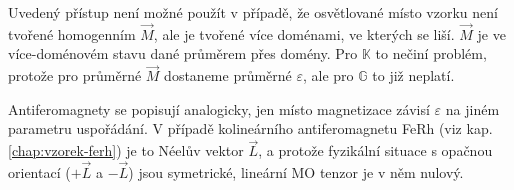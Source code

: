 Uvedený přístup není možné použít v případě, že osvětlované místo vzorku není tvořené homogenním $\vec{M}$, ale je tvořené více doménami, ve kterých se liší.
$\vec{M}$ je ve více-doménovém stavu dané průměrem přes domény.
Pro $\mathbb{K}$ to nečiní problém, protože pro průměrné $\vec{M}$ dostaneme průměrné $\varepsilon$, ale pro $\mathbb{G}$ to již neplatí.

Antiferomagnety se popisují analogicky, jen místo magnetizace závisí $\varepsilon$ na jiném parametru uspořádání.
V případě kolineárního antiferomagnetu FeRh (viz kap. \ref{chap:vzorek-ferh}) je to Néelův vektor $\vec{L}$,
a protože fyzikální situace s opačnou orientací ($+\vec{L}$ a $-\vec{L}$) jsou symetrické, lineární MO tenzor je v něm nulový.
